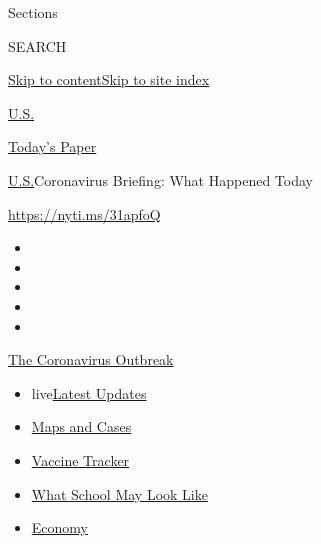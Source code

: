 Sections

SEARCH

\protect\hyperlink{site-content}{Skip to
content}\protect\hyperlink{site-index}{Skip to site index}

\href{https://www.nytimes3xbfgragh.onion/section/us}{U.S.}

\href{https://myaccount.nytimes3xbfgragh.onion/auth/login?response_type=cookie\&client_id=vi}{}

\href{https://www.nytimes3xbfgragh.onion/section/todayspaper}{Today's
Paper}

\href{/section/us}{U.S.}\textbar{}Coronavirus Briefing: What Happened
Today

\url{https://nyti.ms/31apfoQ}

\begin{itemize}
\item
\item
\item
\item
\item
\end{itemize}

\href{https://www.nytimes3xbfgragh.onion/news-event/coronavirus?action=click\&pgtype=Article\&state=default\&region=TOP_BANNER\&context=storylines_menu}{The
Coronavirus Outbreak}

\begin{itemize}
\tightlist
\item
  live\href{https://www.nytimes3xbfgragh.onion/2020/08/01/world/coronavirus-covid-19.html?action=click\&pgtype=Article\&state=default\&region=TOP_BANNER\&context=storylines_menu}{Latest
  Updates}
\item
  \href{https://www.nytimes3xbfgragh.onion/interactive/2020/us/coronavirus-us-cases.html?action=click\&pgtype=Article\&state=default\&region=TOP_BANNER\&context=storylines_menu}{Maps
  and Cases}
\item
  \href{https://www.nytimes3xbfgragh.onion/interactive/2020/science/coronavirus-vaccine-tracker.html?action=click\&pgtype=Article\&state=default\&region=TOP_BANNER\&context=storylines_menu}{Vaccine
  Tracker}
\item
  \href{https://www.nytimes3xbfgragh.onion/interactive/2020/07/29/us/schools-reopening-coronavirus.html?action=click\&pgtype=Article\&state=default\&region=TOP_BANNER\&context=storylines_menu}{What
  School May Look Like}
\item
  \href{https://www.nytimes3xbfgragh.onion/live/2020/07/31/business/stock-market-today-coronavirus?action=click\&pgtype=Article\&state=default\&region=TOP_BANNER\&context=storylines_menu}{Economy}
\end{itemize}

